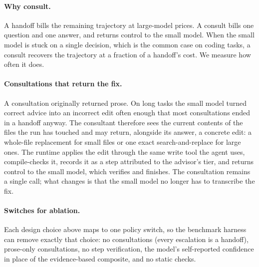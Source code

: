 \paragraph{Why consult.}
A handoff bills the remaining trajectory at large-model prices.
A consult bills one question and one answer, and returns control to the small model.
When the small model is stuck on a single decision, which is the common case on coding tasks, a consult recovers the trajectory at a fraction of a handoff's cost.
We measure how often it does.

\paragraph{Consultations that return the fix.}
A consultation originally returned prose.
On long tasks the small model turned correct advice into an incorrect edit often enough that most consultations ended in a handoff anyway.
The consultant therefore sees the current contents of the files the run has touched and may return, alongside its answer, a concrete edit: a whole-file replacement for small files or one exact search-and-replace for large ones.
The runtime applies the edit through the same write tool the agent uses, compile-checks it, records it as a step attributed to the advisor's tier, and returns control to the small model, which verifies and finishes.
The consultation remains a single call; what changes is that the small model no longer has to transcribe the fix.

\paragraph{Switches for ablation.}
Each design choice above maps to one policy switch, so the benchmark harness can remove exactly that choice: no consultations (every escalation is a handoff), prose-only consultations, no step verification, the model's self-reported confidence in place of the evidence-based composite, and no static checks.

